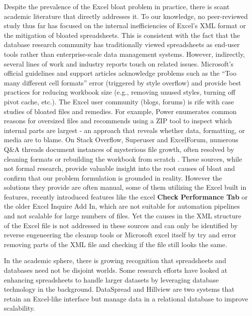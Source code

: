 \documentclass[conference]{IEEEtran}
\begin{document}
Despite the prevalence of the Excel bloat problem in practice, there is scant academic literature that directly addresses it. To our knowledge, no peer-reviewed study thus far has focused on the internal inefficiencies of Excel's XML format or the mitigation of bloated spreadsheets. This is consistent with the fact that the database research community has traditionally viewed spreadsheets as end-user tools rather than enterprise-scale data management systems. However, indirectly, several lines of work and industry reports touch on related issues. Microsoft's official guidelines and support articles acknowledge problems such as the “Too many different cell formats” error (triggered by style overflow)
\cite{Microsoft2024TooManyCellFormats} and provide best practices for reducing workbook size (e.g., removing unused styles, turning off pivot cache, etc.). The Excel user community (blogs, forums) is rife with case studies of bloated files and remedies. For example, Power \cite{Power2025WhyExcelFileLarge}
 enumerates common reasons for oversized files and recommends using a ZIP tool to inspect which internal parts are largest - an approach that reveals whether data, formatting, or media are to blame. On Stack Overflow, Superuser and ExcelForum, numerous Q\&A threads document instances of mysterious file growth, often resolved by cleaning formats or rebuilding the workbook from scratch \cite{chrtak2024ExcelSheetBloated, SuperUser739577, SuperUser63119, ExcelForum1349596}
. These sources, while not formal research, provide valuable insight into the root causes of bloat and confirm that our problem formulation is grounded in reality. However the solutions they provide are often manual, some of them utilizing the Excel built in features, recently introduced features like the excel \textbf{Check Performance Tab} or the older Excel Inquire Add In, which are not suitable for automation pipelines and not scalable for large numbers of files. Yet the causes in the XML structure of the Excel file is not addressed in these sources and can only be identified by reverse engeneering the cleanup tools or Microsoft excel itself by try and error removing parts of the XML file and checking if the file still looks the same.


In the academic sphere, there is growing recognition that spreadsheets and databases need not be disjoint worlds. Some research efforts have looked at enhancing spreadsheets to handle larger datasets by leveraging database technology in the background. DataSpread \cite{Bendre2015DataSpread} and Hillview \cite{Budiu2019Hillview} are two systems that retain an Excel-like interface but manage data in a relational database to improve scalability.
\end{document}

